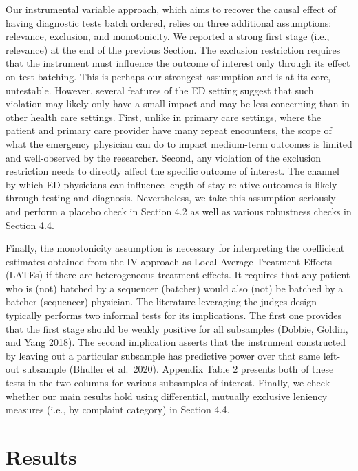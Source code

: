 \documentclass[,,nonblindrev]{informs}
\begin{document}
Our instrumental variable approach, which aims to recover the causal
effect of having diagnostic tests batch ordered, relies on three
additional assumptions: relevance, exclusion, and monotonicity. We
reported a strong first stage (i.e., relevance) at the end of the
previous Section. The exclusion restriction requires that the instrument
must influence the outcome of interest only through its effect on test
batching. This is perhaps our strongest assumption and is at its core,
untestable. However, several features of the ED setting suggest that
such violation may likely only have a small impact and may be less
concerning than in other health care settings. First, unlike in primary
care settings, where the patient and primary care provider have many
repeat encounters, the scope of what the emergency physician can do to
impact medium-term outcomes is limited and well-observed by the
researcher. Second, any violation of the exclusion restriction needs to
directly affect the specific outcome of interest. The channel by which
ED physicians can influence length of stay relative outcomes is likely
through testing and diagnosis. Nevertheless, we take this assumption
seriously and perform a placebo check in Section 4.2 as well as various
robustness checks in Section 4.4.

Finally, the monotonicity assumption is necessary for interpreting the
coefficient estimates obtained from the IV approach as Local Average
Treatment Effects (LATEs) if there are heterogeneous treatment effects.
It requires that any patient who is (not) batched by a sequencer
(batcher) would also (not) be batched by a batcher (sequencer)
physician. The literature leveraging the judges design typically
performs two informal tests for its implications. The first one provides
that the first stage should be weakly positive for all subsamples
(Dobbie, Goldin, and Yang 2018). The second implication asserts that the
instrument constructed by leaving out a particular subsample has
predictive power over that same left-out subsample (Bhuller et
al.~2020). Appendix Table 2 presents both of these tests in the two
columns for various subsamples of interest. Finally, we check whether
our main results hold using differential, mutually exclusive leniency
measures (i.e., by complaint category) in Section 4.4.

\hypertarget{sec:4}{%
\section{Results}\label{sec:4}}
\end{document}
